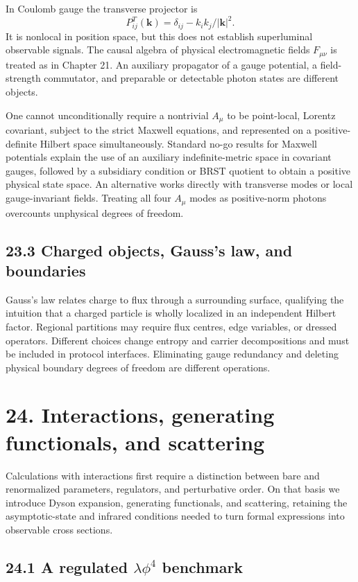 \documentclass[
  11pt,
  oneside]{book}
\begin{document}
In Coulomb gauge the transverse projector is \[
P^T_{ij}(\mathbf k)=\delta_{ij}-k_i k_j/|\mathbf k|^2.
\] It is nonlocal in position space, but this does not establish
superluminal observable signals. The causal algebra of physical
electromagnetic fields \(F_{\mu\nu}\) is treated as in Chapter 21. An
auxiliary propagator of a gauge potential, a field-strength commutator,
and preparable or detectable photon states are different objects.

One cannot unconditionally require a nontrivial \(A_\mu\) to be
point-local, Lorentz covariant, subject to the strict Maxwell equations,
and represented on a positive-definite Hilbert space simultaneously.
Standard no-go results for Maxwell potentials explain the use of an
auxiliary indefinite-metric space in covariant gauges, followed by a
subsidiary condition or BRST quotient to obtain a positive physical
state space. An alternative works directly with transverse modes or
local gauge-invariant fields. Treating all four \(A_\mu\) modes as
positive-norm photons overcounts unphysical degrees of freedom.

\section{23.3 Charged objects, Gauss's law, and boundaries}

Gauss's law relates charge to flux through a surrounding surface,
qualifying the intuition that a charged particle is wholly localized in
an independent Hilbert factor. Regional partitions may require flux
centres, edge variables, or dressed operators. Different choices change
entropy and carrier decompositions and must be included in protocol
interfaces. Eliminating gauge redundancy and deleting physical boundary
degrees of freedom are different operations.

\chapter{24. Interactions, generating functionals, and
scattering}\label{ch-24}

Calculations with interactions first require a distinction between bare
and renormalized parameters, regulators, and perturbative order. On that
basis we introduce Dyson expansion, generating functionals, and
scattering, retaining the asymptotic-state and infrared conditions
needed to turn formal expressions into observable cross sections.

\section{\texorpdfstring{24.1 A regulated \(\lambda\phi^4\)
benchmark}{24.1 A regulated \textbackslash lambda\textbackslash phi\^{}4 benchmark}}
\end{document}
